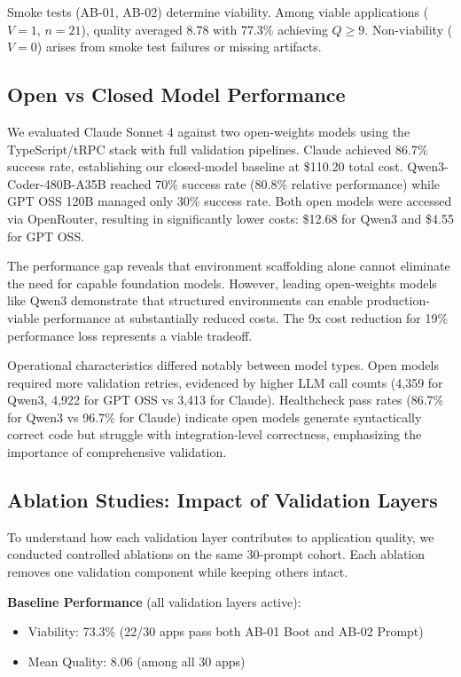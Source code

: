 \documentclass{article}
\begin{document}
Smoke tests (AB-01, AB-02) determine viability. Among viable applications ($V=1$, $n=21$), quality averaged 8.78 with 77.3\% achieving $Q \geq 9$. Non-viability ($V=0$) arises from smoke test failures or missing artifacts.

\subsection{Open vs Closed Model Performance}

We evaluated Claude Sonnet 4 against two open-weights models using the TypeScript/tRPC stack with full validation pipelines. Claude achieved 86.7\% success rate, establishing our closed-model baseline at \$110.20 total cost. Qwen3-Coder-480B-A35B reached 70\% success rate (80.8\% relative performance) while GPT OSS 120B managed only 30\% success rate. Both open models were accessed via OpenRouter, resulting in significantly lower costs: \$12.68 for Qwen3 and \$4.55 for GPT OSS.

The performance gap reveals that environment scaffolding alone cannot eliminate the need for capable foundation models. However, leading open-weights models like Qwen3 demonstrate that structured environments can enable production-viable performance at substantially reduced costs. The 9x cost reduction for 19\% performance loss represents a viable tradeoff.

Operational characteristics differed notably between model types. Open models required more validation retries, evidenced by higher LLM call counts (4,359 for Qwen3, 4,922 for GPT OSS vs 3,413 for Claude). Healthcheck pass rates (86.7\% for Qwen3 vs 96.7\% for Claude) indicate open models generate syntactically correct code but struggle with integration-level correctness, emphasizing the importance of comprehensive validation.

\subsection{Ablation Studies: Impact of Validation Layers}

To understand how each validation layer contributes to application quality, we conducted controlled ablations on the same 30-prompt cohort. Each ablation removes one validation component while keeping others intact.

\textbf{Baseline Performance} (all validation layers active):
\begin{itemize}
\item Viability: 73.3\% (22/30 apps pass both AB-01 Boot and AB-02 Prompt)
\item Mean Quality: 8.06 (among all 30 apps)
\end{itemize}
\end{document}
